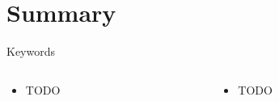 \documentclass{curs}
\begin{document}
\section{Summary}

\begin{frame}{Keywords}
  \begin{columns}
    \begin{column}{0.5\textwidth}
      \begin{itemize}
        \item TODO
      \end{itemize}
    \end{column}
    \begin{column}{0.5\textwidth}
      \begin{itemize}
        \item TODO
      \end{itemize}
    \end{column}
  \end{columns}
\end{frame}
\end{document}
